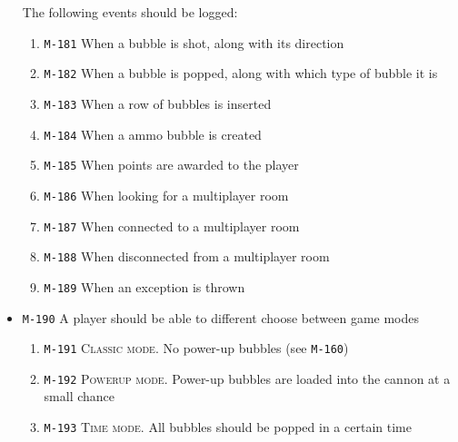 \documentclass[a4paper]{article}
\begin{document}
\begin{itemize}
  	The following events should be logged:
  
        \begin{enumerate}
          \item \texttt{M-181} When a bubble is shot, along with its direction
          \item \texttt{M-182} When a bubble is popped, along with which type of bubble it is
          \item \texttt{M-183} When a row of bubbles is inserted
          \item \texttt{M-184} When a ammo bubble is created
          \item \texttt{M-185} When points are awarded to the player
          \item \texttt{M-186} When looking for a multiplayer room
          \item \texttt{M-187} When connected to a multiplayer room
          \item \texttt{M-188} When disconnected from a multiplayer room
          \item \texttt{M-189} When an exception is thrown
      \end{enumerate}



\item \texttt{M-190} A player should be able to different choose between game modes

        \begin{enumerate}
          \item \texttt{M-191} \textsc{Classic mode.} No power-up bubbles (see \texttt{M-160})
          \item \texttt{M-192} \textsc{Powerup mode.} Power-up bubbles are loaded into the cannon at a small chance
          \item \texttt{M-193} \textsc{Time mode.} All bubbles should be popped in a certain time
      \end{enumerate}     



\end{itemize}

\end{document}
